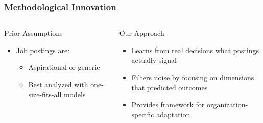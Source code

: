 \documentclass[11pt,xcolor={dvipsnames},hyperref={pdftex,pdfpagemode=UseNone,hidelinks,pdfdisplaydoctitle=true},usepdftitle=false]{beamer}
\begin{document}
\begin{frame}
\frametitle{Methodological Innovation}
\begin{columns}
\begin{column}{0.48\textwidth}
\begin{block}{Prior Assumptions}
\begin{itemize}
\item Job postings are:
\begin{itemize}
\item Aspirational or generic
\item Best analyzed with one-size-fits-all models
\end{itemize}
\end{itemize}
\end{block}
\end{column}

\begin{column}{0.48\textwidth}
\begin{block}{Our Approach}
\begin{itemize}
\item Learns from real decisions what postings actually signal
\item Filters noise by focusing on dimensions that predicted outcomes
\item Provides framework for organization-specific adaptation
\end{itemize}
\end{block}
\end{column}
\end{columns}

\vspace{1em}

\begin{center}
\end{center}
\end{frame}
\end{document}

